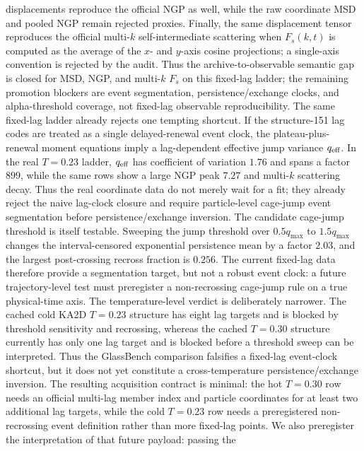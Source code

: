 \documentclass[aps,preprint,onecolumn,superscriptaddress,nofootinbib]{revtex4-2}
\begin{document}
displacements reproduce the official NGP as well, while the raw coordinate MSD
and pooled NGP remain rejected proxies. Finally, the same displacement tensor
reproduces the official multi-\(k\) self-intermediate scattering when
\(F_s(k,t)\) is computed as the average of the \(x\)- and \(y\)-axis cosine
projections; a single-axis convention is rejected by the audit. Thus the
archive-to-observable semantic gap is closed for MSD, NGP, and multi-\(k\)
\(F_s\) on this fixed-lag ladder; the remaining promotion blockers are event
segmentation, persistence/exchange clocks, and alpha-threshold coverage, not
fixed-lag observable reproducibility.
The same fixed-lag ladder already rejects one tempting shortcut. If the
structure-151 lag codes are treated as a single delayed-renewal event clock,
the plateau-plus-renewal moment equations imply a lag-dependent effective jump
variance \(q_{\rm eff}\). In the real \(T=0.23\) ladder, \(q_{\rm eff}\) has
coefficient of variation \(1.76\) and spans a factor \(899\), while the same
rows show a large NGP peak \(7.27\) and multi-\(k\) scattering decay. Thus the
real coordinate data do not merely wait for a fit; they already reject the
naive lag-clock closure and require particle-level cage-jump event
segmentation before persistence/exchange inversion.
The candidate cage-jump threshold is itself testable. Sweeping the jump
threshold over \(0.5q_{\max}\) to \(1.5q_{\max}\) changes the interval-censored
exponential persistence mean by a factor \(2.03\), and the largest
post-crossing recross fraction is \(0.256\). The current fixed-lag data
therefore provide a segmentation target, but not a robust event clock: a
future trajectory-level test must preregister a non-recrossing cage-jump rule
on a true physical-time axis.
The temperature-level verdict is deliberately narrower. The cached cold
KA2D \(T=0.23\) structure has eight lag targets and is blocked by threshold
sensitivity and recrossing, whereas the cached \(T=0.30\) structure currently
has only one lag target and is blocked before a threshold sweep can be
interpreted. Thus the GlassBench comparison falsifies a fixed-lag event-clock
shortcut, but it does not yet constitute a cross-temperature
persistence/exchange inversion.
The resulting acquisition contract is minimal: the hot \(T=0.30\) row needs
an official multi-lag member index and particle coordinates for at least two
additional lag targets, while the cold \(T=0.23\) row needs a preregistered
non-recrossing event definition rather than more fixed-lag points.
We also preregister the interpretation of that future payload: passing the
\end{document}
